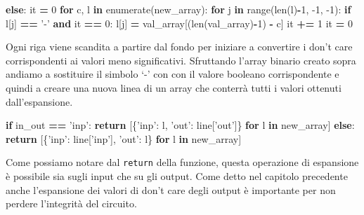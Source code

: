 \documentclass[]{book}
\newenvironment{Shaded}{\begin{snugshade}}{\end{snugshade}}
\newcommand{\BuiltInTok}[1]{#1}
\newcommand{\ControlFlowTok}[1]{\textcolor[rgb]{0.13,0.29,0.53}{\textbf{#1}}}
\newcommand{\DecValTok}[1]{\textcolor[rgb]{0.00,0.00,0.81}{#1}}
\newcommand{\KeywordTok}[1]{\textcolor[rgb]{0.13,0.29,0.53}{\textbf{#1}}}
\newcommand{\NormalTok}[1]{#1}
\newcommand{\OperatorTok}[1]{\textcolor[rgb]{0.81,0.36,0.00}{\textbf{#1}}}
\newcommand{\StringTok}[1]{\textcolor[rgb]{0.31,0.60,0.02}{#1}}
\begin{document}
\begin{Shaded}
\begin{Highlighting}[]
\ControlFlowTok{else}\NormalTok{:}
\NormalTok{  it }\OperatorTok{=} \DecValTok{0}
  \ControlFlowTok{for}\NormalTok{ c, l }\KeywordTok{in} \BuiltInTok{enumerate}\NormalTok{(new_array):}
    \ControlFlowTok{for}\NormalTok{ j }\KeywordTok{in} \BuiltInTok{range}\NormalTok{(}\BuiltInTok{len}\NormalTok{(l)}\OperatorTok{-}\DecValTok{1}\NormalTok{, }\DecValTok{-1}\NormalTok{, }\DecValTok{-1}\NormalTok{):}
      \ControlFlowTok{if}\NormalTok{ l[j] }\OperatorTok{==} \StringTok{'-'} \KeywordTok{and}\NormalTok{ it }\OperatorTok{==} \DecValTok{0}\NormalTok{:}
\NormalTok{        l[j] }\OperatorTok{=}\NormalTok{ val_array[(}\BuiltInTok{len}\NormalTok{(val_array)}\OperatorTok{-}\DecValTok{1}\NormalTok{) }\OperatorTok{-}\NormalTok{ c]}
\NormalTok{        it }\OperatorTok{+=} \DecValTok{1}
\NormalTok{    it }\OperatorTok{=} \DecValTok{0}
\end{Highlighting}
\end{Shaded}

Ogni riga viene scandita a partire dal fondo per iniziare a convertire i don't care corrispondenti ai valori meno significativi. Sfruttando l'array binario creato sopra andiamo a sostituire il simbolo `-' con con il valore booleano corrispondente e quindi a creare una nuova linea di un array che conterrà tutti i valori ottenuti dall'espansione.

\newpage

\begin{Shaded}
\begin{Highlighting}[]
\ControlFlowTok{if}\NormalTok{ in_out }\OperatorTok{==} \StringTok{'inp'}\NormalTok{:}
  \ControlFlowTok{return}\NormalTok{ [\{}\StringTok{'inp'}\NormalTok{:  l, }\StringTok{'out'}\NormalTok{:  line[}\StringTok{'out'}\NormalTok{]\} }\ControlFlowTok{for}\NormalTok{ l }\KeywordTok{in}\NormalTok{ new_array]}
\ControlFlowTok{else}\NormalTok{:}
  \ControlFlowTok{return}\NormalTok{ [\{}\StringTok{'inp'}\NormalTok{:  line[}\StringTok{'inp'}\NormalTok{], }\StringTok{'out'}\NormalTok{:  l\} }\ControlFlowTok{for}\NormalTok{ l }\KeywordTok{in}\NormalTok{ new_array]}
\end{Highlighting}
\end{Shaded}

Come possiamo notare dal \texttt{return} della funzione, questa operazione di espansione è possibile sia sugli input che su gli output. Come detto nel capitolo precedente anche l'espansione dei valori di don't care degli output è importante per non perdere l'integrità del circuito.
\end{document}
